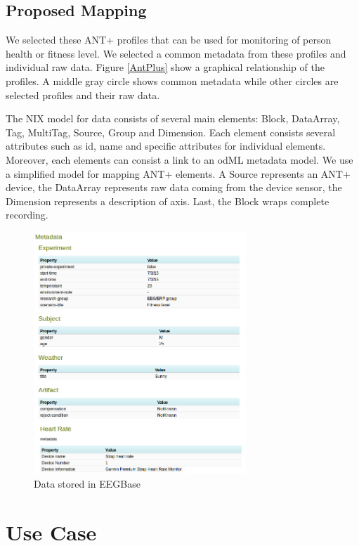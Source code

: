 \documentclass[conference]{IEEEconf}
\begin{document}
\subsection{Proposed Mapping}

We selected these ANT+ profiles that can be used for monitoring of person health or fitness level. We selected a common metadata from these profiles and individual raw data. Figure \ref{AntPlus} show a graphical relationship of the profiles. A middle gray circle shows common metadata while other circles are selected profiles and their raw data. 


The NIX model for data consists of several main elements: Block, DataArray, Tag, MultiTag, Source, Group and Dimension. Each element consists several attributes such as id, name and specific attributes for individual elements. Moreover, each elements can consist a link to an odML metadata model. We use a simplified model for mapping ANT+ elements. A Source represents an ANT+ device, the DataArray represents raw data coming from the device sensor, the Dimension represents a description of axis. Last, the Block wraps complete recording.

\begin{figure}
  \centering\includegraphics[width=8cm]{portal_example.png}
  \caption{Data stored in EEGBase}
  \label{fig:EEGBase}
 \end{figure}


\section{Use Case}\label{sec:use-case}
\end{document}
